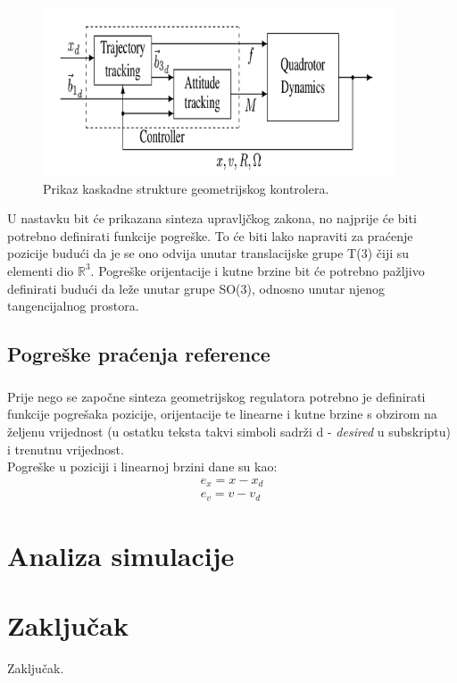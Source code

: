 \documentclass[times, utf8, diplomski]{fer}
\begin{document}
	\newpage
	\clearpage

	\begin{figure}[h!]
		\includegraphics[width=\textwidth, height=5cm]{controller.png}
		\caption{Prikaz kaskadne strukture geometrijskog kontrolera.}
	\end{figure}
	
	U nastavku bit će prikazana sinteza upravljčkog zakona, no najprije će biti potrebno definirati funkcije pogreške. To će biti lako napraviti za praćenje pozicije budući da je se ono odvija unutar translacijske grupe T(3) čiji su elementi dio $\mathbb{R}^3$. Pogreške orijentacije i kutne brzine bit će potrebno pažljivo definirati budući da leže unutar grupe SO(3), odnosno unutar njenog tangencijalnog prostora.
	
\section{Pogreške praćenja reference}

	\paragraph{}Prije nego se započne sinteza geometrijskog regulatora potrebno je definirati funkcije pogrešaka pozicije, orijentacije te linearne i kutne brzine s obzirom na željenu vrijednost (u ostatku teksta takvi simboli sadrži d - \textit{desired} u subskriptu) i trenutnu vrijednost. \\
	Pogreške u poziciji i linearnoj brzini dane su kao:
	\begin{gather}
		e_x = x - x_d \\
		e_v = v - v_d
	\end{gather}
	
\chapter{Analiza simulacije}
\chapter{Zaključak}
Zaključak.
\end{document}
